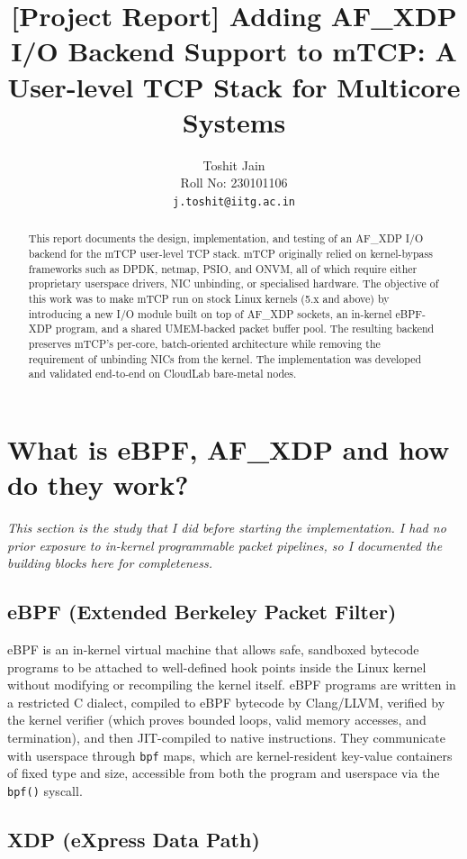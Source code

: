 \documentclass[10pt, letterpaper, twocolumn]{article}
\title{\Large \bfseries [Project Report] Adding AF\_XDP I/O Backend Support to mTCP: A User-level TCP Stack for Multicore Systems}
\author{
    {\Large Toshit Jain} \\
    {\large Roll No: 230101106} \\
    {\large \texttt{j.toshit@iitg.ac.in}}
}
\date{}
\begin{document}
\maketitle

\begin{abstract}
\noindent This report documents the design, implementation, and testing of an AF\_XDP I/O backend for the mTCP user-level TCP stack. mTCP originally relied on kernel-bypass frameworks such as DPDK, netmap, PSIO, and ONVM, all of which require either proprietary userspace drivers, NIC unbinding, or specialised hardware. The objective of this work was to make mTCP run on stock Linux kernels (5.x and above) by introducing a new I/O module built on top of AF\_XDP sockets, an in-kernel eBPF-XDP program, and a shared UMEM-backed packet buffer pool. The resulting backend preserves mTCP's per-core, batch-oriented architecture while removing the requirement of unbinding NICs from the kernel. The implementation was developed and validated end-to-end on CloudLab bare-metal nodes.
\end{abstract}

\section{What is eBPF, AF\_XDP and how do they work?}

\textit{This section is the study that I did before starting the implementation. I had no prior exposure to in-kernel programmable packet pipelines, so I documented the building blocks here for completeness.}

\subsection{eBPF (Extended Berkeley Packet Filter)}

eBPF is an in-kernel virtual machine that allows safe, sandboxed bytecode programs to be attached to well-defined hook points inside the Linux kernel without modifying or recompiling the kernel itself. eBPF programs are written in a restricted C dialect, compiled to eBPF bytecode by Clang/LLVM, verified by the kernel verifier (which proves bounded loops, valid memory accesses, and termination), and then JIT-compiled to native instructions. They communicate with userspace through \texttt{bpf} maps, which are kernel-resident key-value containers of fixed type and size, accessible from both the program and userspace via the \texttt{bpf()} syscall.

\subsection{XDP (eXpress Data Path)}
\end{document}

